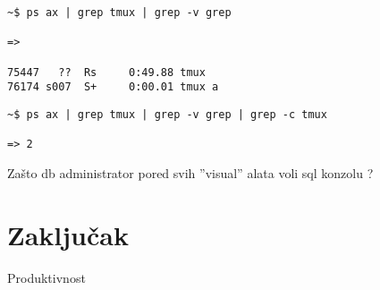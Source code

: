 \documentclass[times, utf8, seminar]{fit}
\begin{document}
\begin{lstlisting}
~$ ps ax | grep tmux | grep -v grep

=>

75447   ??  Rs     0:49.88 tmux
76174 s007  S+     0:00.01 tmux a
\end{lstlisting}

\begin{lstlisting}
~$ ps ax | grep tmux | grep -v grep | grep -c tmux

=> 2
\end{lstlisting}


Zašto db administrator pored svih ''visual'' alata voli sql konzolu ?


\chapter{Zaključak}

Produktivnost


%
%
\end{document}
